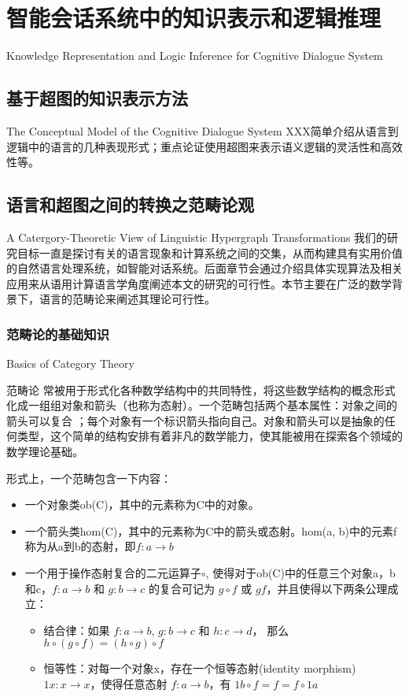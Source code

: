 \chapter{智能会话系统中的知识表示和逻辑推理}{Knowledge Representation and Logic Inference for Cognitive Dialogue System}

\section{基于超图的知识表示方法}{The Conceptual Model of the Cognitive Dialogue System}
XXX简单介绍从语言到逻辑中的语言的几种表现形式；重点论证使用超图来表示语义逻辑的灵活性和高效性等。




\section{语言和超图之间的转换之范畴论观}{A Catergory-Theoretic View of Linguistic Hypergraph Transformations}
我们的研究目标一直是探讨有关的语言现象和计算系统之间的交集，从而构建具有实用价值的自然语言处理系统，如智能对话系统。后面章节会通过介绍具体实现算法及相关应用来从语用计算语言学角度阐述本文的研究的可行性。本节主要在广泛的数学背景下，语言的范畴论来阐述其理论可行性。

\subsection{范畴论的基础知识}{Basics of Category Theory}

范畴论 \cite{LawvereSchanuel97}常被用于形式化各种数学结构中的共同特性，将这些数学结构的概念形式化成一组组对象和箭头（也称为态射）。一个范畴包括两个基本属性：对象之间的箭头可以复合 ；每个对象有一个标识箭头指向自己。对象和箭头可以是抽象的任何类型，这个简单的结构安排有着非凡的数学能力，使其能被用在探索各个领域的数学理论基础。

形式上，一个范畴包含一下内容：

\begin{itemize}
\item 一个对象类ob(C)，其中的元素称为C中的对象。
\item 一个箭头类hom(C)，其中的元素称为C中的箭头或态射。hom(a, b)中的元素f称为从a到b的态射，即$f : a \rightarrow b$
\item 一个用于操作态射复合的二元运算子$\circ$, 使得对于ob(C)中的任意三个对象a，b和c，$f : a \rightarrow b$ 和 $g : b \rightarrow c$ 的复合可记为 $g \circ f$ 或 $gf$，并且使得以下两条公理成立：

\begin{itemize}
\item 结合律：如果 $f : a \rightarrow b$, $g : b \rightarrow c$ 和 $h : c \rightarrow d$， 那么 $h \circ (g \circ f) = (h \circ g) \circ f$
\item 恒等性：对每一个对象x，存在一个恒等态射(identity morphism) $1x : x \rightarrow x$，使得任意态射 $f : a \rightarrow b$，有 $1b \circ f = f = f \circ 1a$ 
\end{itemize}
\end{itemize}

